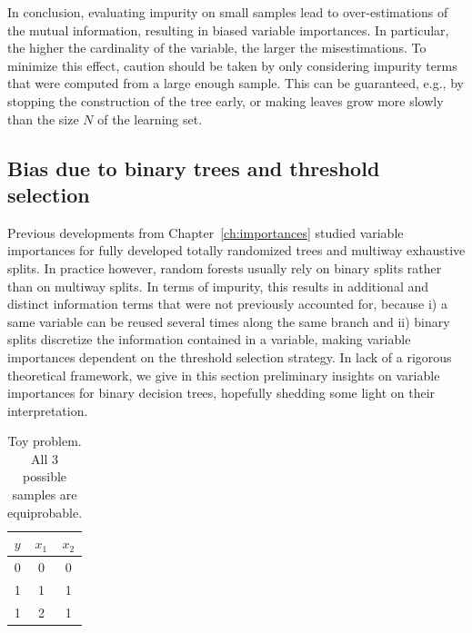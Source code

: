 In conclusion, evaluating impurity on small samples lead to over-estimations of
the mutual information, resulting in biased variable importances. In
particular, the higher the cardinality of the variable,  the larger the
misestimations. To minimize this effect, caution should be taken by only
considering impurity terms that were computed from a large enough sample. This
can be guaranteed, e.g., by stopping the construction of the tree early, or
making leaves grow more slowly than the size $N$ of the learning set.

\subsection{Bias due to binary trees and threshold selection}
\label{sec:bias:tree}

Previous developments from Chapter~\ref{ch:importances} studied variable
importances for fully developed totally randomized trees and multiway
exhaustive splits. In practice however, random forests usually rely on binary
splits rather than on multiway splits. In terms of impurity, this results in
additional and distinct information terms that were not previously accounted
for, because i) a same variable can be reused several times along the same
branch and ii) binary splits discretize the information contained in a
variable, making variable importances dependent on the threshold selection
strategy. In lack of a rigorous theoretical framework, we give in this section
preliminary insights on variable importances for binary decision trees,
hopefully shedding some light on their interpretation.

\begin{table}
    \centering
    \begin{tabular}{| c | c c |}
    \hline
    $y$ & $x_1$ & $x_2$ \\
    \hline
    \hline
    0 & 0 & 0 \\
    1 & 1 & 1 \\
    1 & 2 & 1 \\
    \hline
    \end{tabular}
    \caption{Toy problem. All $3$ possible samples are equiprobable.}
    \label{table:simulation:bias:tree}
\end{table}

